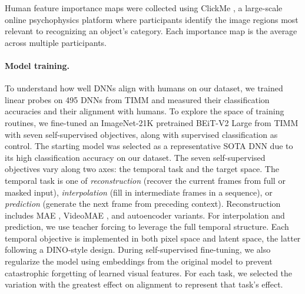\documentclass[submission]{ccn}  %
\begin{document}
Human feature importance maps were collected using ClickMe \citep{linsley2019clickme}, a large-scale online psychophysics platform where participants identify the image regions most relevant to recognizing an object's category. Each importance map is the average across multiple participants.

\paragraph{Model training.} 
To understand how well DNNs align with humans on our dataset, we trained linear probes on 495 DNNs from TIMM \citep{rw2019timm} and measured their classification accuracies and their alignment with humans.
To explore the space of training routines, we fine-tuned an ImageNet-21K \citep{ridnik2021imagenet21kpretrainingmasses} pretrained BEiT-V2 Large \citep{beitv2} from TIMM with seven self-supervised objectives, along with supervised classification as control.
The starting model was selected as a representative SOTA DNN due to its high classification accuracy on our dataset.
The seven self-supervised objectives vary along two axes: the temporal task and the target space. The temporal task is one of \textit{reconstruction} (recover the current frames from full or masked input), \textit{interpolation} (fill in intermediate frames in a sequence), or \textit{prediction} (generate the next frame from preceding context). Reconstruction includes MAE \citep{mae}, VideoMAE \citep{videomae}, and autoencoder \citep{hinton_autoencoder} variants. For interpolation and prediction, we use teacher forcing \citep{teacherforcing} to leverage the full temporal structure. Each temporal objective is implemented in both pixel space and latent space, the latter following a DINO-style \citep{dinov1} design.
During self-supervised fine-tuning, we also regularize the model using embeddings from the original model to prevent catastrophic forgetting of learned visual features.
For each task, we selected the variation with the greatest effect on alignment to represent that task's effect.
\end{document}
